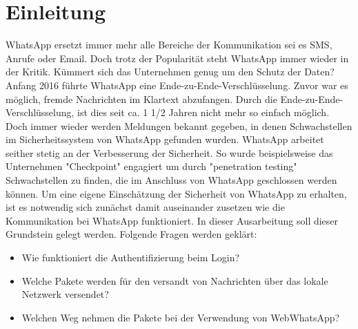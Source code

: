\section{Einleitung}\label{sec:einleitung}

WhatsApp ersetzt immer mehr alle Bereiche der Kommunikation sei es SMS, Anrufe oder Email.
Doch trotz der Popularität steht WhatsApp immer wieder in der Kritik. Kümmert sich das Unternehmen genug um
den Schutz der Daten? Anfang 2016 führte WhatsApp eine Ende-zu-Ende-Verschlüsselung. Zuvor war 
es möglich, fremde Nachrichten im Klartext abzufangen. Durch die Ende-zu-Ende-Verschlüsselung, ist dies
seit ca. 1 1/2 Jahren nicht mehr so einfach möglich. Doch immer wieder werden Meldungen bekannt gegeben, in denen 
Schwachstellen im Sicherheitssystem von WhatsApp gefunden wurden. WhatsApp arbeitet seither stetig an der Verbesserung
der Sicherheit. So wurde beispielsweise das Unternehmen "Checkpoint" engagiert um durch "penetration testing" Schwachstellen zu finden, die im Anschluss
von WhatsApp geschlossen werden können. 
Um eine eigene Einschätzung der Sicherheit von WhatsApp zu erhalten, ist es notwendig sich zunächst damit auseinander zusetzen
wie die Kommunikation bei WhatsApp funktioniert. In dieser Ausarbeitung soll dieser Grundstein gelegt werden. 
Folgende Fragen werden geklärt: 

\begin{itemize}
    \item Wie funktioniert die Authentifizierung beim Login?
    \item Welche Pakete werden für den versandt von Nachrichten über das lokale Netzwerk versendet?
    \item Welchen Weg nehmen die Pakete bei der Verwendung von WebWhatsApp?
\end{itemize}

